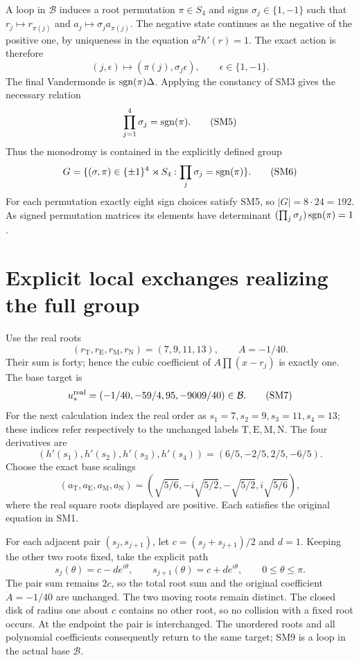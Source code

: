 \documentclass[11pt]{article}
\begin{document}
A loop in $\mathcal B$ induces a root permutation $\pi\in S_4$
and signs $\sigma_j\in\{1,-1\}$ such that
$r_j\mapsto r_{\pi(j)}$ and $a_j\mapsto\sigma_j a_{\pi(j)}$.
The negative state continues as the negative of the positive one,
by uniqueness in the equation $a^2h'(r)=1$. The exact action is
therefore
\begin{equation}
 (j,\epsilon)\longmapsto(\pi(j),\sigma_j\epsilon),
 \qquad \epsilon\in\{1,-1\}.\tag{SM4}
\end{equation}
The final Vandermonde is $\operatorname{sgn}(\pi)\Delta$. Applying the
constancy of SM3 gives the necessary relation
\begin{equation}
 \prod_{j=1}^4\sigma_j=\operatorname{sgn}(\pi).\tag{SM5}
\end{equation}
Thus the monodromy is contained in the explicitly defined group
\begin{equation}
 G=\{(\sigma,\pi)\in\{\pm1\}^4\rtimes S_4:
                       \prod_j\sigma_j=\operatorname{sgn}(\pi)\}.
 \tag{SM6}
\end{equation}
For each permutation exactly eight sign choices satisfy SM5, so
$|G|=8\cdot24=192$. As signed permutation matrices its elements
have determinant $(\prod_j\sigma_j)\operatorname{sgn}(\pi)=1$.

\section{Explicit local exchanges realizing the full group}
Use the real roots
\[
 (r_{\mathrm T},r_{\mathrm E},r_{\mathrm M},r_{\mathrm N})
 =(7,9,11,13),\qquad A=-1/40.
\]
Their sum is forty; hence the cubic coefficient of
$A\prod(x-r_j)$ is exactly one. The base target is
\begin{equation}
 u_*^{\rm real}=(-1/40,-59/4,95,-9009/40)\in\mathcal B.
 \tag{SM7}
\end{equation}
For the next calculation index the real order as
$s_1=7,s_2=9,s_3=11,s_4=13$; these indices refer respectively
to the unchanged labels $\mathrm T,\mathrm E,\mathrm M,\mathrm N$.
The four derivatives are
\[
 (h'(s_1),h'(s_2),h'(s_3),h'(s_4))
       =(6/5,-2/5,2/5,-6/5).
\]
Choose the exact base scalings
\begin{equation}
 (a_{\mathrm T},a_{\mathrm E},a_{\mathrm M},a_{\mathrm N})
 =\left(\sqrt{5/6},-i\sqrt{5/2},-\sqrt{5/2},i\sqrt{5/6}\right),
 \tag{SM8}
\end{equation}
where the real square roots displayed are positive. Each satisfies
the original equation in SM1.

For each adjacent pair $(s_j,s_{j+1})$, let
$c=(s_j+s_{j+1})/2$ and $d=1$. Keeping the other two roots fixed,
take the explicit path
\begin{equation}
 s_j(\theta)=c-d e^{i\theta},\qquad
 s_{j+1}(\theta)=c+d e^{i\theta},\qquad0\le\theta\le\pi.
 \tag{SM9}
\end{equation}
The pair sum remains $2c$, so the total root sum and the original
coefficient $A=-1/40$ are unchanged. The two moving roots remain
distinct. The closed disk of radius one about $c$ contains no
other root, so no collision with a fixed root occurs. At the
endpoint the pair is interchanged. The unordered roots and all
polynomial coefficients consequently return to the same target;
SM9 is a loop in the actual base $\mathcal B$.
\end{document}

